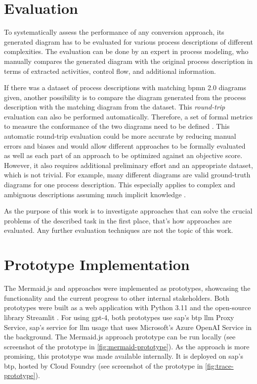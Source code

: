 \chapter{Evaluation}
To systematically assess the performance of any conversion approach, its generated diagram has to be evaluated for various process descriptions of different complexities. The evaluation can be done by an expert in process modeling, who manually compares the generated diagram with the original process description in terms of extracted activities, control flow, and additional information.

If there was a dataset of process descriptions with matching \acs{bpmn} 2.0 diagrams given, another possibility is to compare the diagram generated from the process description with the matching diagram from the dataset. This \textit{round-trip} evaluation can also be performed automatically. Therefore, a set of formal metrics to measure the conformance of the two diagrams need to be defined \cite{bpmn2-comformance, bpmn-event-log-conformance-checking, bpmn-conformance}. This automatic round-trip evaluation could be more accurate by reducing manual errors and biases and would allow different approaches to be formally evaluated as well as each part of an approach to be optimized against an objective score. However, it also requires additional preliminary effort and an appropriate dataset, which is not trivial. For example, many different diagrams are valid ground-truth diagrams for one process description. This especially applies to complex and ambiguous descriptions assuming much implicit knowledge \cite{process-model-ambiguity}.

As the purpose of this work is to investigate approaches that can solve the crucial problems of the described task in the first place, that's how approaches are evaluated. Any further evaluation techniques are not the topic of this work.

\chapter{Prototype Implementation}
The Mermaid.js and  approaches were implemented as prototypes, showcasing the functionality and the current progress to other internal stakeholders. Both prototypes were built as a web application with Python 3.11 \cite{python3} and the open-source library Streamlit \cite{streamlit}. For using \acs{gpt}-4, both prototypes use \gls{sap}'s \acs{btp} \acs{llm} Proxy Service, \gls{sap}'s service for \acs{llm} usage that uses Microsoft's Azure OpenAI Service \cite{azure-openai} in the background. The Mermaid.js approach prototype can be run locally (see screenshot of the prototype in \autoref{fig:mermaid-prototype}). As the  approach is more promising, this prototype was made available internally. It is deployed on \gls{sap}'s \gls{btp}, hosted by Cloud Foundry (see screenshot of the prototype in \autoref{fig:trace-prototype}).


